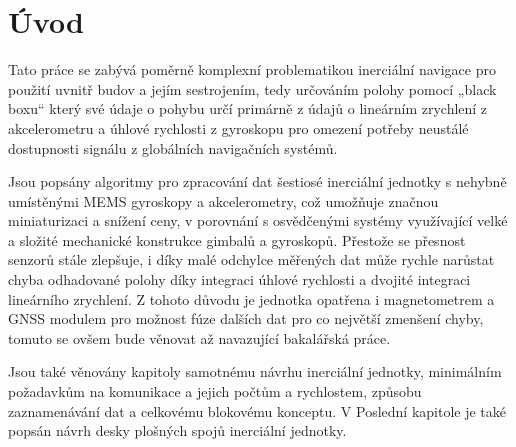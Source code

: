\chapter*{Úvod}
{}

Tato práce se zabývá poměrně komplexní problematikou inerciální navigace pro použití uvnitř budov a jejím sestrojením, tedy určováním polohy pomocí „black boxu“ který své údaje o pohybu určí primárně z údajů o lineárním zrychlení z akcelerometru a úhlové rychlosti z gyroskopu pro omezení potřeby neustálé dostupnosti signálu z globálních navigačních systémů.

Jsou popsány algoritmy pro zpracování dat šestiosé inerciální jednotky s nehybně umístěnými \ac{MEMS} gyroskopy a akcelerometry, což umožňuje značnou miniaturizaci a snížení ceny, v porovnání s osvědčenými systémy využívající velké a složité mechanické konstrukce gimbalů a gyroskopů. Přestože se přesnost senzorů stále zlepšuje, i díky malé odchylce měřených dat může rychle narůstat chyba odhadované polohy díky integraci úhlové rychlosti a dvojité integraci lineárního zrychlení. Z tohoto důvodu je jednotka opatřena i magnetometrem a \ac{GNSS} modulem pro možnost fúze dalších dat pro co největší zmenšení chyby, tomuto se ovšem bude věnovat až navazující bakalářská práce.

Jsou také věnovány kapitoly samotnému návrhu inerciální jednotky, minimálním požadavkům na komunikace a jejich počtům a rychlostem, způsobu zaznamenávání dat a celkovému blokovému konceptu. V Poslední kapitole je také popsán návrh desky plošných spojů inerciální jednotky. 